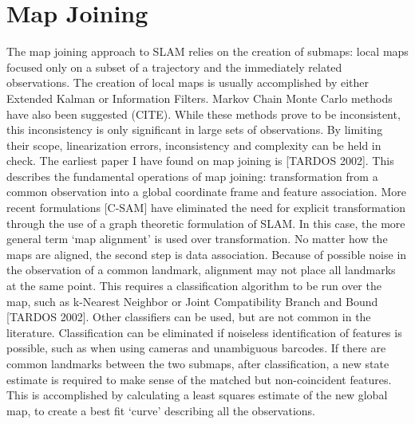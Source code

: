 \documentclass[12pt]{report}
\begin{document}
\section{Map Joining}
The map joining approach to SLAM relies on the creation of submaps: local maps focused only on a subset of a trajectory and the immediately related observations.  The creation of local maps is usually accomplished by either Extended Kalman or Information Filters. Markov Chain Monte Carlo methods have also been suggested (CITE).  While these methods prove to be inconsistent, this inconsistency is only significant in large sets of observations.  By limiting their scope, linearization errors, inconsistency and complexity can be held in check.
The earliest paper I have found on map joining is [TARDOS 2002].  This describes the fundamental operations of map joining: transformation from a common observation into a global coordinate frame and feature association.  More recent formulations [C-SAM] have eliminated the need for explicit transformation through the use of a graph theoretic formulation of SLAM.  In this case, the more general term ‘map alignment’ is used over transformation.
No matter how the maps are aligned, the second step is data association.  Because of possible noise in the observation of a common landmark, alignment may not place all landmarks at the same point.  This requires a classification algorithm to be run over the map, such as k-Nearest Neighbor or Joint Compatibility Branch and Bound [TARDOS 2002].  Other classifiers can be used, but are not common in the literature.  Classification can be eliminated if noiseless identification of features is possible, such as when using cameras and unambiguous barcodes.
If there are common landmarks between the two submaps, after classification, a new state estimate is required to make sense of the matched but non-coincident features.  This is accomplished by calculating a least squares estimate of the new global map, to create a best fit ‘curve’ describing all the observations.
\end{document}

